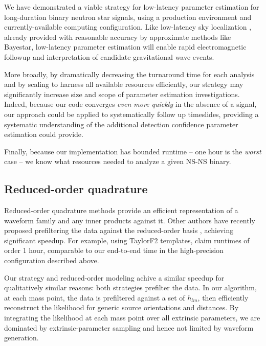 \documentclass[twocolumn,prd,nofootinbib]{revtex4}
\newcommand\BS{{\sc Bayestar}}
\begin{document}
We have demonstrated a viable strategy for low-latency parameter estimation for long-duration binary neutron star signals, using
a production environment and currently-available computing configuration.   
%
Like low-latency sky localization 
\cite{gwastro-skyloc-Sidery2013,LIGO-2013-WhitePaper-CoordinatedEMObserving}, already provided with reasonable accuracy
by approximate methods like \BS{}, low-latency parameter estimation will enable rapid electromagnetic followup and interpretation of
candidate gravitational wave events. 


%
More broadly, by dramatically decreasing the turnaround time for each analysis and by scaling to harness all available
resources efficiently, our strategy may significantly increase size and scope of parameter estimation investigations.
%
Indeed, because our code converges \emph{even more quickly} in the absence of a signal, our approach could be applied to
systematically follow up timeslides, providing a systematic understanding of the additional detection confidence
parameter estimation could provide. 
%

Finally, because our implementation has bounded runtime -- one hour is the \emph{worst} case -- we know what  resources needed to analyze a given NS-NS binary. 


\subsection{Reduced-order quadrature}
Reduced-order quadrature methods provide an efficient representation of a waveform family and any inner products against
it.   Other authors have recently proposed prefiltering the data against the reduced-order basis
\cite{gw-astro-ReducedOrderQuadraturePE-TiglioEtAl2014}, achieving significant speedup.  For example, using TaylorF2
templates, \citet{gw-astro-ReducedOrderQuadraturePE-TiglioEtAl2014} claim runtimes of order 1 hour, comparable to our
end-to-end time in the high-precision configuration described above.

Our strategy and reduced-order modeling achive a similar speedup for qualitatively similar reasons: both strategies
prefilter the data.   In our algorithm, at each mass point, the data is prefiltered  against a
set of $h_{lm}$, then efficiently reconstruct the likelihood for generic source orientations and distances.  
%
By integrating the likelihood at each mass point over all extrinsic parameters,  we are dominated by extrinsic-parameter
sampling and  hence not limited by waveform generation.
\end{document}
